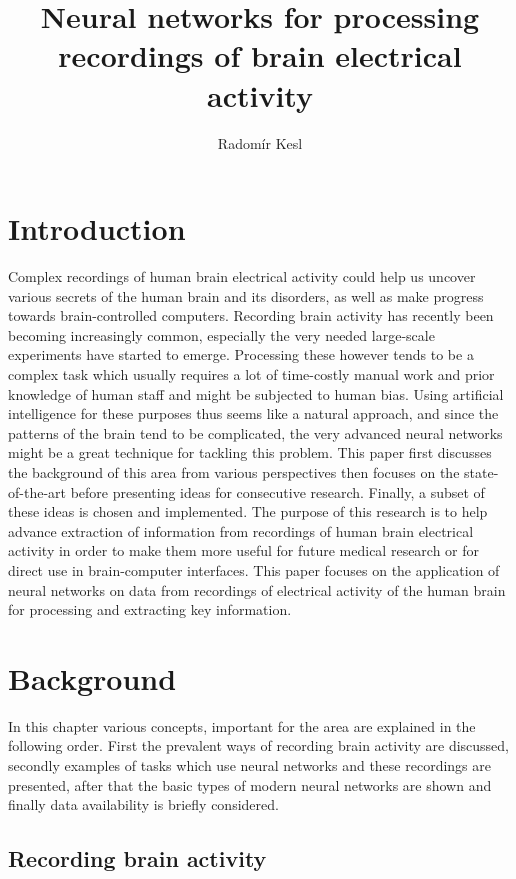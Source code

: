 \documentclass[english,BP]{thesiskiv}
\author{Radomír Kesl}
\title{Neural networks for processing recordings of brain electrical activity}
\begin{document}
\maketitle
\tableofcontents

\chapter{Introduction}

	Complex recordings of human brain electrical activity could help us uncover various secrets of the human brain and its disorders, as well as make progress towards brain-controlled computers.
	Recording brain activity has recently been becoming increasingly common, especially the very needed large-scale experiments have started to emerge. Processing these however tends to be a complex task which usually requires a lot of time-costly manual work and prior knowledge of human staff and might be subjected to human bias. Using artificial intelligence for these purposes thus seems like a natural approach, and since the patterns of the brain tend to be complicated, the very advanced neural networks might be a great technique for tackling this problem.
	This paper first discusses the background of this area from various perspectives then focuses on the state-of-the-art before presenting ideas for consecutive research. Finally, a subset of these ideas is chosen and implemented.
	The purpose of this research is to help advance extraction of information from recordings of human brain electrical activity in order to make them more useful  for future medical research or for direct use in brain-computer interfaces.
	This paper focuses on the application of neural networks on data from recordings of electrical activity of the human brain for processing and extracting key information.

\chapter{Background}

In this chapter various concepts, important for the area are explained in the following order. First the prevalent ways of recording brain activity are discussed, secondly examples of tasks which use neural networks and these recordings are presented, after that the basic types of modern neural networks are shown and finally data availability is briefly considered.

	\section{Recording brain activity}
\end{document}
